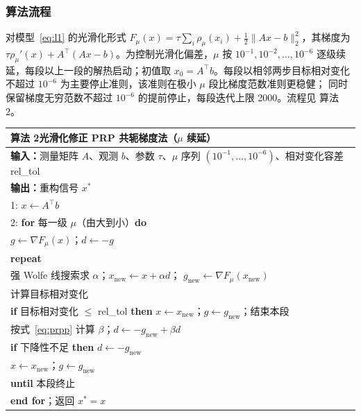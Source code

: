 \documentclass[withoutpreface,bwprint]{cumcmthesis}
\newenvironment{algtable}[1]{%
  \par\medskip\noindent
  \begin{minipage}{\textwidth}\scriptsize
  \begin{tabular}{p{\dimexpr\textwidth-2\tabcolsep}}
    \toprule
    \textbf{#1} \\
    \midrule
}{%
    \\ \bottomrule
  \end{tabular}
  \end{minipage}
  \par\medskip
}
\begin{document}
\subsubsection{算法流程}

对模型~\eqref{eq:l1} 的光滑化形式
$F_{\mu}(x)=\tau\sum_i\rho_{\mu}(x_i)+\frac12\|Ax-b\|_2^{2}$，其梯度为
$\tau\rho_{\mu}'(x)+A^{\top}(Ax-b)$。为控制光滑化偏差，$\mu$ 按
$10^{-1},10^{-2},\dots,10^{-6}$ 逐级续延，每段以上一段的解热启动；初值取
$x_0=A^{\top}b$\cite{wu2021}。每段以相邻两步目标相对变化不超过 $10^{-6}$
为主要停止准则，该准则在极小 $\mu$ 段比梯度范数准则更稳健；
同时保留梯度无穷范数不超过 $10^{-6}$ 的提前停止，每段迭代上限 2000。流程见
算法 2。

\begin{algtable}{算法 2\quad 光滑化修正 PRP 共轭梯度法（$\mu$ 续延）}
\textbf{输入：}测量矩阵 $A$、观测 $b$、参数 $\tau$、$\mu$ 序列
$(10^{-1},\dots,10^{-6})$、相对变化容差 rel\_tol \\
\textbf{输出：}重构信号 $x^{*}$ \\
1: $x\leftarrow A^{\top}b$ \\
2: \textbf{for} 每一级 $\mu$（由大到小）\textbf{do} \\
\hspace{1.5em} $g\leftarrow\nabla F_{\mu}(x)$；$d\leftarrow-g$ \\
\hspace{1.5em} \textbf{repeat} \\
\hspace{3em} 强 Wolfe 线搜索求 $\alpha$；$x_{\mathrm{new}}\leftarrow x+\alpha d$；
$g_{\mathrm{new}}\leftarrow\nabla F_{\mu}(x_{\mathrm{new}})$ \\
\hspace{3em} 计算目标相对变化 \\
\hspace{3em} \textbf{if} 目标相对变化 $\le$ rel\_tol \textbf{then}
$x\leftarrow x_{\mathrm{new}}$；$g\leftarrow g_{\mathrm{new}}$；结束本段 \\
\hspace{3em} 按式~\eqref{eq:prpp} 计算 $\beta$；$d\leftarrow-g_{\mathrm{new}}+\beta d$ \\
\hspace{3em} \textbf{if} 下降性不足 \textbf{then} $d\leftarrow-g_{\mathrm{new}}$ \\
\hspace{3em} $x\leftarrow x_{\mathrm{new}}$；$g\leftarrow g_{\mathrm{new}}$ \\
\hspace{1.5em} \textbf{until} 本段终止 \\
\textbf{end for}；返回 $x^{*}=x$
\end{algtable}
\end{document}
